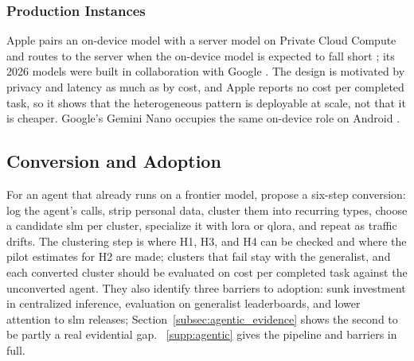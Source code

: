 \subsubsection{Production Instances}
\label{subsubsec:agentic_production}

Apple pairs an on-device model with a server model on Private Cloud Compute and routes to the server when the on-device model is expected to fall short \citep{gunter2025afm}; its 2026 models were built in collaboration with Google \citep{apple2026afm3,google_apple2026statement}. The design is motivated by privacy and latency as much as by cost, and Apple reports no cost per completed task, so it shows that the heterogeneous pattern is deployable at scale, not that it is cheaper. Google's Gemini Nano occupies the same on-device role on Android \citep{gemini2023}.

\subsection{Conversion and Adoption}
\label{subsec:agentic_conversion_summary}
For an agent that already runs on a frontier model, \citet{belcak2025slm_agentic} propose a six-step conversion: log the agent's calls, strip personal data, cluster them into recurring types, choose a candidate \gls{slm} per cluster, specialize it with \gls{lora} or \gls{qlora}, and repeat as traffic drifts. The clustering step is where H1, H3, and H4 can be checked and where the pilot estimates for H2 are made; clusters that fail stay with the generalist, and each converted cluster should be evaluated on cost per completed task against the unconverted agent. They also identify three barriers to adoption: sunk investment in centralized inference, evaluation on generalist leaderboards, and lower attention to \gls{slm} releases; Section~\ref{subsec:agentic_evidence} shows the second to be partly a real evidential gap. \suppsec~\ref{supp:agentic} gives the pipeline and barriers in full.
